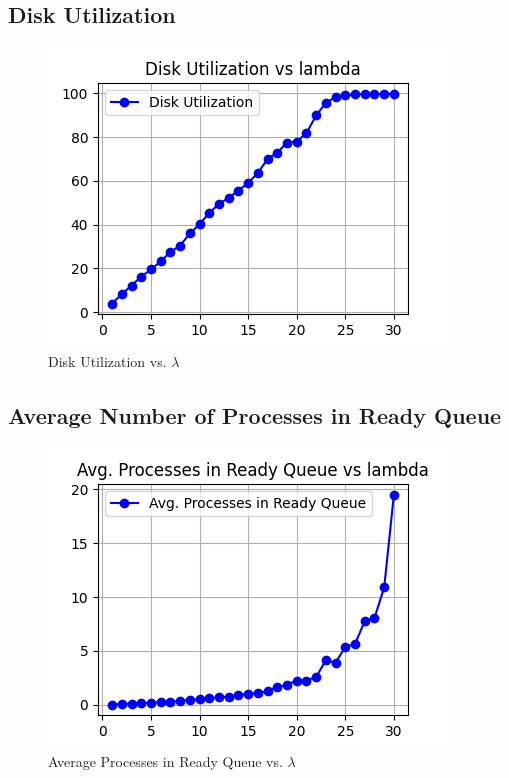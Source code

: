 \documentclass[12pt]{article}
\begin{document}
\subsection{Disk Utilization}
\begin{figure}[H]
\centering
\centerline{\includegraphics{figs/Disk Utilization_vs_lambda.png}}
\caption{Disk Utilization vs. $\lambda$}
\end{figure}

\subsection{Average Number of Processes in Ready Queue}
\begin{figure}[H]
\centering
\centerline{\includegraphics{figs/Avg. Processes in Ready Queue_vs_lambda.png}}
\caption{Average Processes in Ready Queue vs. $\lambda$}
\end{figure}
\end{document}
